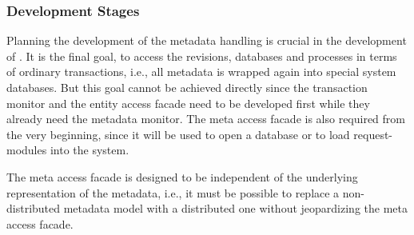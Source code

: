 \documentclass[a4paper, 10pt]{book}
\begin{document}
                                \subsubsection{Development Stages}
                                \label{sec:development-stages-3}

                                Planning the development of the metadata handling is crucial in the
                                development of \SYNEIGHT. It is the final goal, to access the revisions,
                                databases and processes in terms of ordinary transactions, i.e., all
                                metadata is wrapped again into special system databases. But this goal
                                cannot be achieved directly since the transaction monitor and the
                                entity access facade need to be developed first while they already
                                need the metadata monitor. The meta access facade is also required
                                from the very beginning, since it will be used to open a database or
                                to load request-modules into the system.


                                The meta access facade is designed to be independent of the underlying
                                representation of the metadata, i.e., it must be possible to replace a
                                non-distributed metadata model with a distributed one without
                                jeopardizing the meta access facade. 
\end{document}

